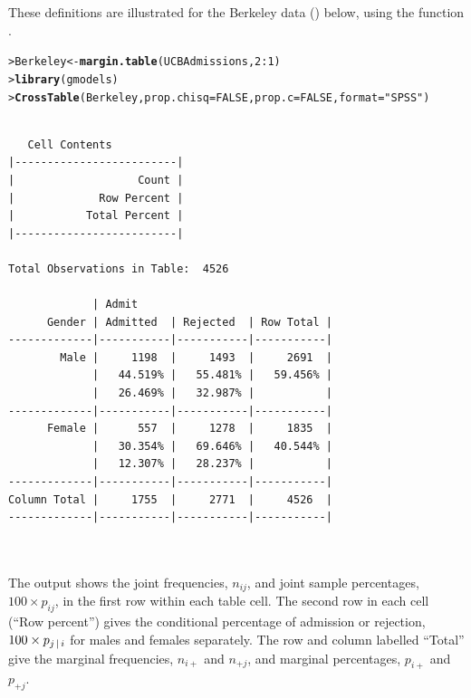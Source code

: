 \documentclass[10pt,krantz2]{krantz}\usepackage[]{graphicx}\usepackage[]{color}
\makeatletter
\newcommand{\hlnum}[1]{\textcolor[rgb]{0.686,0.059,0.569}{#1}}%
\newcommand{\hlstr}[1]{\textcolor[rgb]{0.192,0.494,0.8}{#1}}%
\newcommand{\hlopt}[1]{\textcolor[rgb]{0,0,0}{#1}}%
\newcommand{\hlstd}[1]{\textcolor[rgb]{0.345,0.345,0.345}{#1}}%
\newcommand{\hlkwb}[1]{\textcolor[rgb]{0.69,0.353,0.396}{#1}}%
\newcommand{\hlkwc}[1]{\textcolor[rgb]{0.333,0.667,0.333}{#1}}%
\newcommand{\hlkwd}[1]{\textcolor[rgb]{0.737,0.353,0.396}{\textbf{#1}}}%
\newenvironment{kframe}{%
 \def\at@end@of@kframe{}%
 \ifinner\ifhmode%
  \def\at@end@of@kframe{\end{minipage}}%
  \begin{minipage}{\columnwidth}%
 \fi\fi%
 \def\FrameCommand##1{\hskip\@totalleftmargin \hskip-\fboxsep
 \colorbox{shadecolor}{##1}\hskip-\fboxsep
     \hskip-\linewidth \hskip-\@totalleftmargin \hskip\columnwidth}%
 \MakeFramed {\advance\hsize-\width
   \@totalleftmargin\z@ \linewidth\hsize
   \@setminipage}}%
 {\par\unskip\endMakeFramed%
 \at@end@of@kframe}
\newenvironment{knitrout}{}{} %
\renewenvironment{knitrout}{\small\renewcommand{\baselinestretch}{.85}}{} %
\makeatother
\begin{document}
These definitions are illustrated
for the Berkeley data () below,
using the function .
\begin{knitrout}
\color{fgcolor}\begin{kframe}
\begin{alltt}
\hlstd{> }\hlstd{Berkeley} \hlkwb{<-} \hlkwd{margin.table}\hlstd{(UCBAdmissions,} \hlnum{2}\hlopt{:}\hlnum{1}\hlstd{)}
\hlstd{> }\hlkwd{library}\hlstd{(gmodels)}
\hlstd{> }\hlkwd{CrossTable}\hlstd{(Berkeley,} \hlkwc{prop.chisq} \hlstd{=} \hlnum{FALSE}\hlstd{,} \hlkwc{prop.c} \hlstd{=} \hlnum{FALSE}\hlstd{,} \hlkwc{format} \hlstd{=} \hlstr{"SPSS"}\hlstd{)}
\end{alltt}
\begin{verbatim}

   Cell Contents
|-------------------------|
|                   Count |
|             Row Percent |
|           Total Percent |
|-------------------------|

Total Observations in Table:  4526 

             | Admit 
      Gender | Admitted  | Rejected  | Row Total | 
-------------|-----------|-----------|-----------|
        Male |     1198  |     1493  |     2691  | 
             |   44.519% |   55.481% |   59.456% | 
             |   26.469% |   32.987% |           | 
-------------|-----------|-----------|-----------|
      Female |      557  |     1278  |     1835  | 
             |   30.354% |   69.646% |   40.544% | 
             |   12.307% |   28.237% |           | 
-------------|-----------|-----------|-----------|
Column Total |     1755  |     2771  |     4526  | 
-------------|-----------|-----------|-----------|

 
\end{verbatim}
\end{kframe}
\end{knitrout}
The output shows the joint frequencies, $n_{ij}$, and joint sample percentages,
$100 \times p_{ij}$, in the first row within each table cell.
The second row in each cell (``Row percent'')
gives the conditional percentage of admission or rejection,
$100 \times p_{j\, | \, i}$ for males and females separately.
The row and column labelled ``Total'' give the
marginal frequencies, $n_{i+}$ and $n_{+j}$,
and marginal percentages, $p_{i+}$ and $p_{+j}$.


\end{document}

